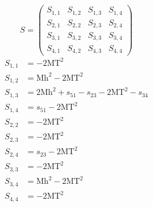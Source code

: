 \documentclass[a4paper]{article}
\begin{document}
\begin{equation}
S=\left(\begin{array}{cccc}
   S_{1,1}&
   S_{1,2}&
   S_{1,3}&
   S_{1,4}\\
   S_{2,1}&
   S_{2,2}&
   S_{2,3}&
   S_{2,4}\\
   S_{3,1}&
   S_{3,2}&
   S_{3,3}&
   S_{3,4}\\
   S_{4,1}&
   S_{4,2}&
   S_{4,3}&
   S_{4,4}\end{array}\right)
\end{equation}
\begin{subequations}
\begin{align}
   S_{1,1}&=-2\text{MT}^2\\
   S_{1,2}&=\text{Mh}^2-2\text{MT}^2\\
   S_{1,3}&=2\text{Mh}^2+s_{51}-s_{23}-2\text{MT}^2-s_{34}\\
   S_{1,4}&=s_{51}-2\text{MT}^2\\
   S_{2,2}&=-2\text{MT}^2\\
   S_{2,3}&=-2\text{MT}^2\\
   S_{2,4}&=s_{23}-2\text{MT}^2\\
   S_{3,3}&=-2\text{MT}^2\\
   S_{3,4}&=\text{Mh}^2-2\text{MT}^2\\
   S_{4,4}&=-2\text{MT}^2
\end{align}
\end{subequations}
\end{document}
